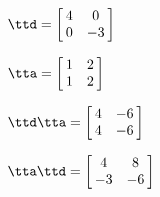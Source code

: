 {$\ttd = \left[\hskip -3pt \begin{array}{cc} 4&0\\  0&-3\end{array}\hskip -3pt
 \right]$
 
$\tta = \left[\hskip -3pt \begin{array}{cc} 1&2\\  1&2\end{array}\hskip -3pt
 \right] $}
{$\ttd\tta= \left[\hskip -3pt \begin{array}{cc} 4&-6\\  4&-6\end{array}\hskip -3pt
 \right] $

$\tta\ttd =  \left[\hskip -3pt \begin{array}{cc} 4&8\\  -3&-6\end{array}\hskip -3pt \right]$
}
  
